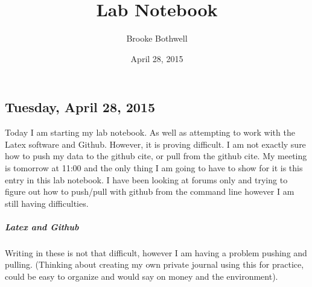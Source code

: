 \documentclass{Journal}
\title{Lab Notebook}
\author{Brooke Bothwell}
\date{April 28, 2015}
\begin{document}
	\maketitle 
	\subsection{Tuesday, April 28, 2015}
Today I am starting my lab notebook. As well as attempting to work with the Latex software and Github. However, it is proving difficult. I am not exactly sure how to push my data to the github cite, or pull from the github cite. My meeting is tomorrow at 11:00 and the only thing I am going to have to show for it is this entry in this lab notebook. I have been looking at forums only and trying to figure out how to push/pull with github from the command line however I am still having difficulties.
		\subparagraph{Latex and Github}
Writing in these is not that difficult, however I am having a problem pushing and pulling. (Thinking about creating my own private journal using this for practice, could be easy to organize and would say on money and the environment).	
\end{document}
